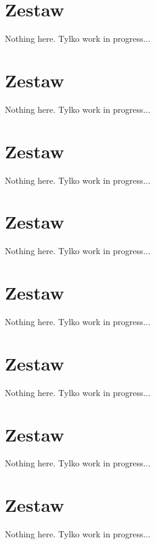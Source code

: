 \documentclass{mwart}
\begin{document}
\newpage
\section{Zestaw}          %
Nothing here. Tylko work in progress...
\section{Zestaw}          %
Nothing here. Tylko work in progress...
\section{Zestaw}          %
Nothing here. Tylko work in progress...
\section{Zestaw}          %
Nothing here. Tylko work in progress...
\section{Zestaw}          %
Nothing here. Tylko work in progress...
\section{Zestaw}          %
Nothing here. Tylko work in progress...
\section{Zestaw}          %
Nothing here. Tylko work in progress...
\section{Zestaw}          %
Nothing here. Tylko work in progress...
\end{document}
